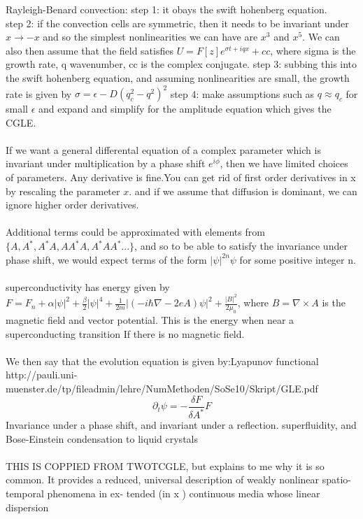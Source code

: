 \documentclass[a4paper,12pt]{report}
\begin{document}
Rayleigh-Benard convection:
step 1: it obays the swift hohenberg equation. \\
step 2: if the convection cells are symmetric, then it needs to be invariant under $x\rightarrow -x$  and so the simplest nonlinearities we can have are $x^3$ and $x^5$. We can also then assume that the field satisfies $U=F[z] e^{\sigma t+iqx}+cc$, where sigma is the growth rate, q wavenumber, cc is the complex conjugate. 
step 3: subbing this into the swift hohenberg equation, and assuming nonlinearities are small, the growth rate is given by $\sigma = \epsilon -D(q_c^2-q^2)^2$
step 4: make assumptions such as $q\approx q_c$ for small $\epsilon$ and expand and simplify for the amplitude equation which gives the CGLE.
\\\\
If we want a general differental equation of a complex parameter which is invariant under multiplication by a phase shift $e^{i\phi}$, then we have limited choices of parameters.
Any derivative is fine.You can get rid of first order derivatives in x by rescaling the parameter $x$. and if we assume that diffusion is dominant, we can ignore higher order derivatives. 
\\\\
Additional terms could be approximated with elements from $\{A,A^*, A^*A, AA^*A,A^*AA^* ...\}$, and so to be able to satisfy the invariance under phase shift, we would expect terms of the form $|\psi|^{2n}\psi$ for some positive integer n. 
\\\\
superconductivity has energy given by $F=F_n +\alpha |\psi|^2+\frac{\beta}{2}|\psi|^4 +\frac{1}{2m}|(-i\hbar\nabla -2eA)\psi|^2+\frac{|B|^2}{2\mu_0}$, where $B=\nabla \times A$ is the magnetic field and vector potential. This is the energy when near a superconducting transition If there is no magnetic field.
\\\\
We then say that the evolution equation is given by:Lyapunov functional http://pauli.uni-muenster.de/tp/fileadmin/lehre/NumMethoden/SoSe10/Skript/GLE.pdf
$$\partial_t \psi = -\frac{\delta F}{\delta A^*} F $$
Invariance under a phase shift, and invariant under a reflection.
superfluidity,
and Bose-Einstein condensation to liquid crystals
\\\\
THIS IS COPPIED FROM TWOTCGLE, but explains to me why it is so common.
It provides a reduced, universal description of
weakly nonlinear spatio-temporal phenomena in ex-
tended (in x  ) continuous media whose linear dispersion
\end{document}
